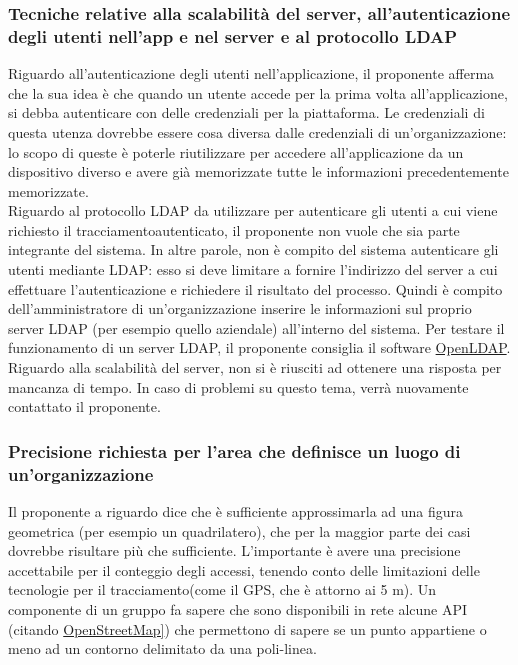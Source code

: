 \subsubsection*{Tecniche relative alla scalabilità del server, all'autenticazione degli utenti nell'app e nel server e al protocollo LDAP}
Riguardo all'autenticazione degli utenti nell'applicazione, il proponente afferma che la sua idea è che quando un utente accede per la prima volta all'applicazione, si debba autenticare con delle credenziali per la piattaforma.
Le credenziali di questa utenza dovrebbe essere cosa diversa dalle credenziali di un'organizzazione: lo scopo di queste è poterle riutilizzare per accedere all'applicazione da un dispositivo diverso e avere già
memorizzate tutte le informazioni precedentemente memorizzate.\\
Riguardo al protocollo LDAP da utilizzare per autenticare gli utenti a cui viene richiesto il tracciamentoautenticato, il proponente non vuole che sia parte integrante del sistema.
In altre parole, non è compito del sistema autenticare gli utenti mediante LDAP: esso si deve limitare a fornire l'indirizzo del server a cui effettuare l'autenticazione e richiedere il risultato del processo.
Quindi è compito dell'amministratore di un'organizzazione inserire le informazioni sul proprio server LDAP (per esempio quello aziendale) all'interno del sistema.
Per testare il funzionamento di un server LDAP, il proponente consiglia il software \href{https://www.openldap.org/}{OpenLDAP}.\\
Riguardo alla scalabilità del server, non si è riusciti ad ottenere una risposta per mancanza di tempo. In caso di problemi su questo tema, verrà nuovamente contattato il proponente.

\subsubsection*{Precisione richiesta per l'area che definisce un luogo di un'organizzazione}
Il proponente a riguardo dice che è sufficiente approssimarla ad una figura geometrica (per esempio un quadrilatero), che per la maggior parte dei casi dovrebbe risultare più che sufficiente.
L'importante è avere una precisione accettabile per il conteggio degli accessi, tenendo conto delle limitazioni delle tecnologie per il tracciamento(come il GPS, che è attorno ai 5 m).
Un componente di un gruppo fa sapere che sono disponibili in rete alcune API (citando \href{https://www.openstreetmap.org/}{OpenStreetMap]}) che permettono di sapere se un punto appartiene o meno ad un contorno delimitato da una poli-linea.

